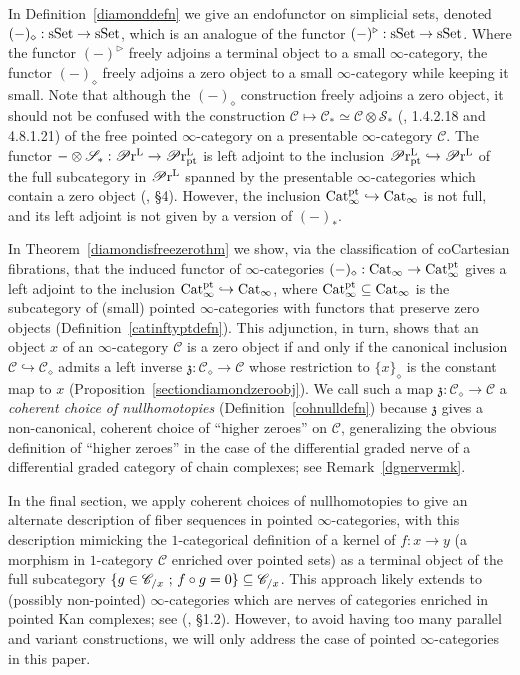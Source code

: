 \documentclass{tac}
\newcommand{\f}[1]{\mathfrak{#1}}
\newcommand{\s}[1]{\mathscr{#1}}
\newcommand{\tx}[1]{\textnormal{#1}}
\newcommand{\prl}{\s{P}\tx{r}^\tx{L}}
\begin{document}
In Definition~\ref{diamonddefn} we give an endofunctor on simplicial sets, denoted $(-)_\diamond : \tx{sSet} \to \tx{sSet}$, which is an analogue of the functor $(-)^\triangleright : \tx{sSet} \to \tx{sSet}$.  Where the functor $(-)^\triangleright$ freely adjoins a terminal object to a small $\infty$-category, the functor $(-)_\diamond$ freely adjoins a zero object to a small $\infty$-category while keeping it small.  Note that although the $(-)_\diamond$ construction freely adjoins a zero object, it should not be confused with the construction $\s{C} \mapsto \s{C}_* \simeq \s{C} \otimes \s{S}_*$ (\cite{ha}, 1.4.2.18 and 4.8.1.21) of the free pointed $\infty$-category on a presentable $\infty$-category $\s{C}$.  The functor $-\otimes \s{S_*} : \prl \to \prl_{\tx{pt}}$ is left adjoint to the inclusion $\prl_{\tx{pt}} \hookrightarrow \prl$ of the full subcategory in $\prl$ spanned by the presentable $\infty$-categories which contain a zero object (\cite{univloopmachine}, \S 4).  However, the inclusion $\tx{Cat}_\infty^\tx{pt} \hookrightarrow \tx{Cat}_\infty$ is not full, and its left adjoint is not given by a version of $(-)_*$. 

In Theorem~\ref{diamondisfreezerothm} we show, via the classification of coCartesian fibrations, that the induced functor of $\infty$-categories $(-)_\diamond : \tx{Cat}_\infty \to \tx{Cat}_\infty^\tx{pt}$ gives a left adjoint to the inclusion $\tx{Cat}_\infty^\tx{pt} \hookrightarrow \tx{Cat}_\infty$, where $\tx{Cat}_\infty^\tx{pt} \subseteq \tx{Cat}_\infty$ is the subcategory of (small) pointed $\infty$-categories with functors that preserve zero objects (Definition~\ref{catinftyptdefn}).  This adjunction, in turn, shows that an object $x$ of an $\infty$-category $\s{C}$ is a zero object if and only if the canonical inclusion $\s{C}\hookrightarrow \s{C}_\diamond$ admits a left inverse $\f{z} : \s{C}_\diamond \to \s{C}$ whose restriction to $\{x \}_\diamond$ is the constant map to $x$ (Proposition~\ref{sectiondiamondzeroobj}).  We call such a map $\f{z} : \s{C}_\diamond \to \s{C}$ a \emph{coherent choice of nullhomotopies} (Definition~\ref{cohnulldefn}) because $\f{z}$ gives a non-canonical, coherent choice of ``higher zeroes'' on $\s{C}$, generalizing the obvious definition of ``higher zeroes'' in the case of the differential graded nerve of a differential graded category of chain complexes; see Remark~\ref{dgnervermk}.  

In the final section, we apply coherent choices of nullhomotopies to give an alternate description of fiber sequences in pointed $\infty$-categories, with this description mimicking the $1$-categorical definition of a kernel of $f: x\to y$ (a morphism in $1$-category $\s{C}$ enriched over pointed sets) as a terminal object of the full subcategory $\{ g\in \s{C}_{/x}\tx{ ; } f\circ g=0 \} \subseteq \s{C}_{/x}$.  This approach likely extends to (possibly non-pointed) $\infty$-categories which are nerves of categories enriched in pointed Kan complexes; see (\cite{thesis}, \S 1.2).  However, to avoid having too many parallel and variant constructions, we will only address the case of pointed $\infty$-categories in this paper.
\end{document}
